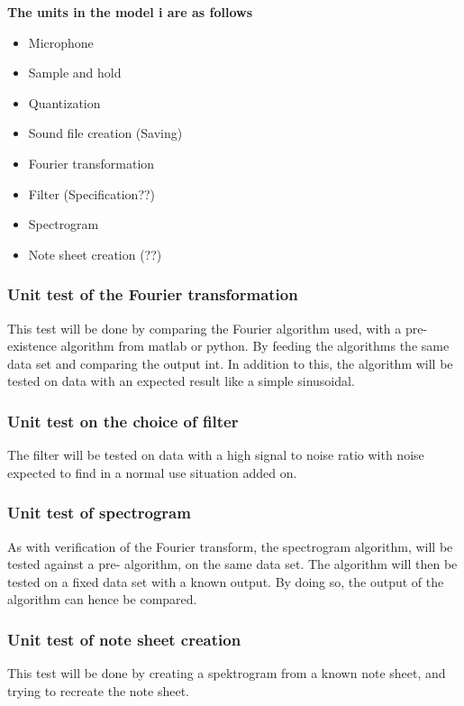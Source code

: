 \textbf{The  units in the model i are as follows }
\begin{itemize}
	\item Microphone
	\item Sample and hold
	\item Quantization
	\item Sound file creation (Saving)
	\item Fourier transformation
	\item Filter (Specification??)
	\item Spectrogram
	\item Note sheet creation (??)
\end{itemize}


\subsubsection{Unit test of the Fourier transformation}
This test will be done by comparing the Fourier algorithm used, with a pre-existence algorithm from matlab or python.
By feeding the algorithms the same data set and comparing the output int. 
In addition to this, the algorithm will be tested on data with an expected result like a simple sinusoidal.
\subsubsection{Unit test on the choice of filter}
The filter will be tested on data with a high signal to noise ratio with noise expected to find in a normal use situation added on.
\subsubsection{Unit test of spectrogram}
As with verification of the Fourier transform, the spectrogram algorithm, will be tested against a pre- algorithm, on the same data set.
The algorithm will then be tested on a fixed data set with a known output.
By doing so, the output of the algorithm can hence be compared.

\subsubsection{Unit test of note sheet creation}
This test will be done by creating a spektrogram from a known note sheet, and trying to recreate the note sheet.


